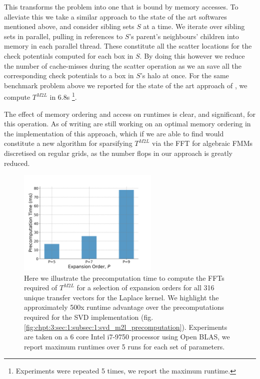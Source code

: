 This transforms the problem into one that is bound by memory accesses. To alleviate this we take a similar approach to the state of the art softwares mentioned above, and consider sibling sets $S$ at a time. We iterate over sibling sets in parallel, pulling in references to $S$'s parent's neighbours' children into memory in each parallel thread. These constitute all the scatter locations for the check potentials computed for each box in $S$. By doing this however we reduce the number of cache-misses during the scatter operation as we an save all the corresponding check potentials to a box in $S$'s halo at once. For the same benchmark problem above we reported for the state of the art approach of \cite{malhotra2015pvfmm}, we compute $T^{M2L}$ in 6.8s \footnote{Experiments were repeated 5 times, we report the maximum runtime.}.

The effect of memory ordering and access on runtimes is clear, and significant, for this operation. As of writing are still working on an optimal memory ordering in the implementation of this approach, which if we are able to find would constitute a new algorithm for sparsifying $T^{M2L}$ via the FFT for algebraic FMMs discretised on regular grids, as the number flops in our approach is greatly reduced.

\begin{figure}
    \centering
    \includegraphics[width=0.6\textwidth]{images/ch_3/fft_m2l_precomputation.png}
    \caption{Here we illustrate the precomputation time to compute the FFTs required of $T^{M2L}$ for a selection of expansion orders for all 316 unique transfer vectors for the Laplace kernel. We highlight the approximately 500x runtime advantage over the precomputations required for the SVD implementation (fig. \ref{fig:chpt:3:sec:1:subsec:1:svd_m2l_precomputation}). Experiments are taken on a 6 core Intel i7-9750 processor using Open BLAS, we report maximum runtimes over 5 runs
    for each set of parameters.}
    \label{fig:chpt:3:sec:1:subsec:2:fft_m2l_precomputation}
\end{figure}
